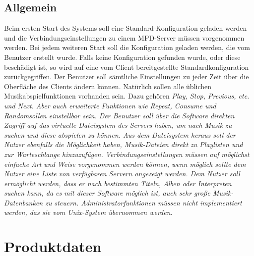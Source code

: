 \subsection{Allgemein}
Beim ersten Start des Systems soll eine Standard-Konfiguration geladen werden und die Verbindungseinstellungen
zu einem MPD-Server müssen vorgenommen werden. Bei jedem weiteren Start soll die Konfiguration geladen werden,
die vom Benutzer erstellt wurde. Falls keine Konfiguration gefunden wurde, oder diese beschädigt ist,
so wird auf eine vom Client bereitgestellte Standardkonfiguration zurückgegriffen. Der Benutzer soll sämtliche
Einstellungen zu jeder Zeit über die Oberfläche des Clients ändern können.
Natürlich sollen alle üblichen Musikabspielfunktionen vorhanden sein. Dazu gehören \it Play, Stop, Previous, etc. und Next.\rm
Aber auch erweiterte Funktionen wie \it Repeat, Consume und Random\rm sollen einstellbar sein.
Der Benutzer soll über die Software direkten Zugriff auf das virtuelle Dateisystem des Servers haben, um nach Musik zu suchen und
diese abspielen zu können. Aus dem Dateisystem heraus soll der Nutzer ebenfalls die Möglichkeit haben, Musik-Dateien
direkt zu Playlisten und zur Warteschlange hinzuzufügen.
Verbindungseinstellungen müssen auf möglichst einfache Art und Weise vorgenommen werden können, wenn möglich
sollte dem Nutzer eine Liste von verfügbaren Servern angezeigt werden. 
Dem Nutzer soll ermöglicht werden, dass er nach bestimmten Titeln, Alben oder Interpreten suchen kann, da 
es mit dieser Software möglich ist, auch sehr große Musik-Datenbanken zu steuern.
Administratorfunktionen müssen nicht implementiert werden, das sie vom Unix-System übernommen werden.

\section{Produktdaten}
